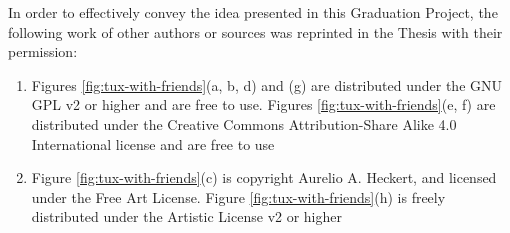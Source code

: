 In order to effectively convey the idea presented in this Graduation Project, the
following work of other authors or sources was reprinted in the Thesis with
their permission:
\begin{enumerate}
\item Figures \ref{fig:tux-with-friends}(a, b, d) and (g) are distributed under the
GNU GPL v2 or higher and are free to use. Figures \ref{fig:tux-with-friends}(e, f)
are distributed under the Creative Commons Attribution-Share Alike 4.0 International
license and are free to use

\item Figure \ref{fig:tux-with-friends}(c) is copyright Aurelio A. Heckert, and licensed
under the Free Art License. Figure \ref{fig:tux-with-friends}(h) is freely distributed under the Artistic
License v2 or higher
\end{enumerate}
\par
